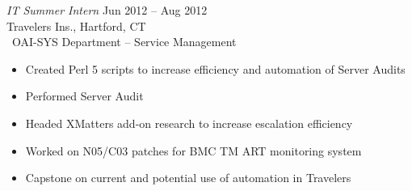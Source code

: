 \documentclass[margin]{res}
\begin{document}
\begin{resume}
                     {\sl IT Summer Intern} \hfill Jun 2012 -- Aug 2012 \\
                     Travelers Ins., Hartford, CT\\\
                     OAI-SYS Department -- Service Management
                     \begin{itemize} \itemsep -2pt %
                         \item Created Perl 5 scripts to increase efficiency and
                               automation of Server Audits
                         \item Performed Server Audit
                         \item Headed XMatters add-on research to increase escalation
                               efficiency
                         \item Worked on N05/C03 patches for BMC TM ART monitoring
                               system
                         \item Capstone on current and potential use of 
                               automation in Travelers
                     \end{itemize}
      

\end{resume}
\end{document}
